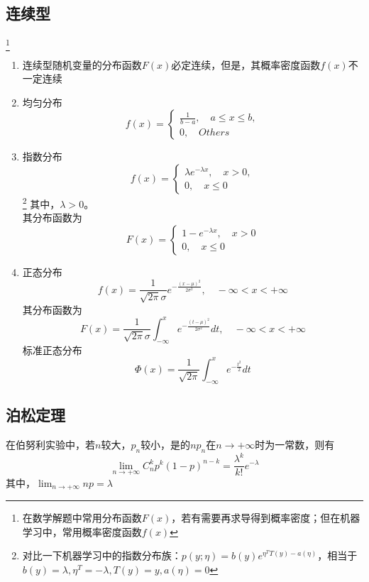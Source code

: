 \subsection{连续型}\footnote{在数学解题中常用分布函数$F(x)$，若有需要再求导得到概率密度；但在机器学习中，常用概率密度函数$f(x)$}
\begin{enumerate}
	\item 连续型随机变量的分布函数$F(x)$必定连续，但是，其概率密度函数$f(x)$不一定连续
	\item 均匀分布
	\[ f(x)=\begin{cases}
	\frac{1}{b-a}, \quad a \leq x \leq b, \\
	0, \quad Others
	\end{cases} \]

	\item 指数分布
	\[ f(x)=\begin{cases}
	\lambda e^{-\lambda x}, \quad x>0, \\
	0, \quad x \leq 0
	\end{cases} \]
	\footnote{对比一下机器学习中的指数分布族：$p(y;\eta) = b(y)e^{\eta^T T(y) - a(\eta)}$，相当于$b(y)=\lambda, \eta^T=-\lambda, T(y)=y, a(\eta)=0$}
	其中，$\lambda>0$。\\
	其分布函数为
	\[ F(x)=\begin{cases}
	1-e^{-\lambda x}, \quad x>0 \\
	0, \quad x \leq 0
	\end{cases} \]

	\item 正态分布
	\begin{equation}
		f(x) = \frac{1}{\sqrt{2\pi} \sigma}e^{-\frac{(x-\mu)^2}{2\sigma^2}}, \quad -\infty < x < +\infty
	\end{equation}
	其分布函数为
	\begin{equation}
		F(x) = \frac{1}{\sqrt{2\pi}\sigma} \int_{-\infty}^x  e^{-\frac{(t-\mu)^2}{2\sigma^2}} dt, \quad -\infty < x < +\infty
	\end{equation}
	标准正态分布
	\begin{equation}
		\Phi(x) = \frac{1}{\sqrt{2\pi}} \int_{-\infty}^x e^{-\frac{t^2}{2}} dt
	\end{equation}
\end{enumerate}

\subsection{泊松定理}
在伯努利实验中，若$n$较大，$p_n$较小，是的$np_n$在$n \to +\infty$时为一常数，则有
\begin{equation}
	\lim_{n \to +\infty}C_n^k p^k (1-p)^{n-k} = \frac{\lambda ^k}{k!}e^{-\lambda}
\end{equation}
其中，$\lim_{n\to+\infty}np = \lambda$







